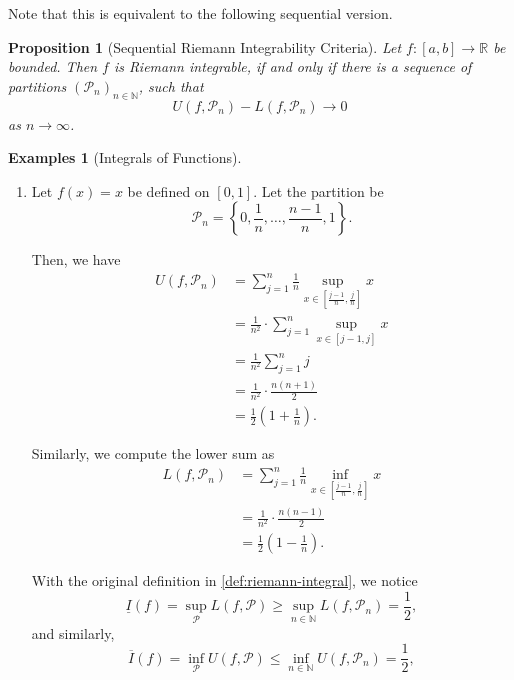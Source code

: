 \documentclass[11pt]{article}
\numberwithin{equation}{section}
\newtheorem{proposition}[theorem]{Proposition}
\theoremstyle{definition}
\newtheorem{examples}[theorem]{Examples}
\theoremstyle{remark}
\newcommand{\pqty}[1]{\left(#1\right)}
\newcommand{\Bqty}[1]{\left\{#1\right\}}
\newcommand{\ccintv}[2]{[#1,#2]}
\newcommand{\functiondomain}[3]{#1:#2\to #3}
\newcommand{\RR}{\mathbb R}
\newcommand{\NN}{\mathbb N}
\newcommand{\partition}{\mathcal P}
\newcommand{\upperSum}{U}
\newcommand{\lowerSum}{L}
\newcommand{\upperI}{\overline I}
\newcommand{\lowerI}{\underline I}
\begin{document}
Note that this is equivalent to the following sequential version.

\begin{proposition}[Sequential Riemann Integrability Criteria]\label{analysis-unit-0148}
    \label{prop:sequential-riemann-integrability-criteria}%
    Let \(\functiondomain{f}{\ccintv{a}{b}}{\RR}\) be bounded. Then \(f\) is Riemann integrable, if and only if there is a sequence of partitions \(\pqty{\partition_n}_{n \in \NN}\), such that
    \[
        \upperSum\pqty{f, \partition_n} - \lowerSum\pqty{f, \partition_n} \to 0
    \]
    as \(n \to \infty\).
\end{proposition}

\begin{examples}[Integrals of Functions]\label{analysis-unit-0149}
    \label{ex:integral-fn}%
    \begin{enumerate}
        \item Let \(f\pqty{x} = x\) be defined on \(\ccintv{0}{1}\). Let the partition be
        \[
            \partition_n = \Bqty{0, \frac{1}{n}, \ldots, \frac{n - 1}{n}, 1}.
        \]

        Then, we have
        \begin{align*}
            \upperSum\pqty{f, \partition_n} &= \sum_{j = 1}^{n} \frac{1}{n} \sup_{x \in \ccintv{\frac{j - 1}{n}}{\frac{j}{n}}} x \\
            &= \frac{1}{n^2} \cdot \sum_{j = 1}^{n} \sup_{x \in \ccintv{j - 1}{j}} x \\
            &= \frac{1}{n^2} \sum_{j = 1}^{n} j \\
            &= \frac{1}{n^2} \cdot \frac{n \pqty{n + 1}}{2} \\
            &= \frac{1}{2} \pqty{1 + \frac{1}{n}}.
        \end{align*}

        Similarly, we compute the lower sum as
        \begin{align*}
            \lowerSum\pqty{f, \partition_n} &= \sum_{j = 1}^{n} \frac{1}{n}\inf_{x \in \ccintv{\frac{j - 1}{n}}{\frac{j}{n}}} x \\
            &= \frac{1}{n^2} \cdot \frac{n \pqty{n - 1}}{2} \\
            &= \frac{1}{2} \pqty{1 - \frac{1}{n}}.
        \end{align*}

        With the original definition in \autoref{def:riemann-integral}, we notice
        \[
            \lowerI\pqty{f} = \sup_{\partition} \lowerSum\pqty{f, \partition} \geq \sup_{n \in \NN} \lowerSum\pqty{f, \partition_n} = \frac{1}{2},
        \]
        and similarly,
        \[
            \upperI\pqty{f} = \inf_{\partition} \upperSum\pqty{f, \partition} \leq \inf_{n \in \NN} \upperSum\pqty{f, \partition_n} = \frac{1}{2},
        \]


\end{enumerate}
\end{examples}
\end{document}
